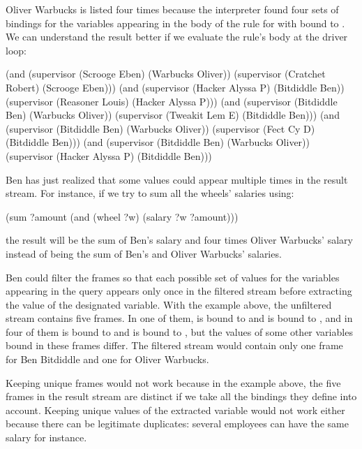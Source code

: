 \begin{exe}[4.65]
    Oliver Warbucks is listed four times because the interpreter found four sets 
    of bindings for the variables appearing in the body of the rule for 
     with  bound to . We can 
    understand the result better if we evaluate the rule’s body at the driver 
    loop:
    \begin{cscm}
        (and (supervisor (Scrooge Eben) (Warbucks Oliver))
             (supervisor (Cratchet Robert) (Scrooge Eben)))
        (and (supervisor (Hacker Alyssa P) (Bitdiddle Ben))
             (supervisor (Reasoner Louis) (Hacker Alyssa P)))
        (and (supervisor (Bitdiddle Ben) (Warbucks Oliver))
             (supervisor (Tweakit Lem E) (Bitdiddle Ben)))
        (and (supervisor (Bitdiddle Ben) (Warbucks Oliver))
             (supervisor (Fect Cy D) (Bitdiddle Ben)))
        (and (supervisor (Bitdiddle Ben) (Warbucks Oliver))
             (supervisor (Hacker Alyssa P) (Bitdiddle Ben)))
    \end{cscm}
\end{exe}

\begin{exe}[4.66]
    Ben has just realized that some values could appear multiple times in the 
    result stream. For instance, if we try to sum all the wheels’ salaries 
    using:
    \begin{cscm}
        (sum ?amount
             (and (wheel ?w)
                  (salary ?w ?amount)))
    \end{cscm}
    the result will be the sum of Ben’s salary and four times Oliver Warbucks’ 
    salary instead of being the sum of Ben’s and Oliver Warbucks’ salaries.

    Ben could filter the frames so that each possible set of values for the 
    variables appearing in the query appears only once in the filtered stream 
    before extracting the value of the designated variable. With the example 
    above, the unfiltered stream contains five frames. In one of them,  
    is bound to  and  is bound to 
    , and in four of them  is bound to
     and  is bound to , but 
    the values of some other variables bound in these frames differ. The 
    filtered stream would contain only one frame for Ben Bitdiddle and one for 
    Oliver Warbucks.

    Keeping unique frames would not work because in the example above, the five 
    frames in the result stream are distinct if we take all the bindings they 
    define into account. Keeping unique values of the extracted variable would 
    not work either because there can be legitimate duplicates: several 
    employees can have the same salary for instance.
\end{exe}

